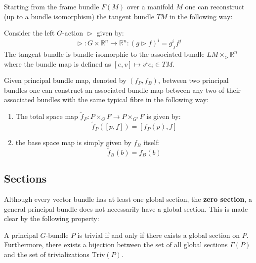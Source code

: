 	\begin{example}
		Starting from the frame bundle $F(M)$ over a manifold $M$ one can reconstruct (up to a bundle isomorphism) the tangent bundle $TM$ in the following way:
		
		Consider the left $G$-action $\vartriangleright$ given by:
		\begin{equation}
			\vartriangleright:G\times\mathbb{R}^n\rightarrow\mathbb{R}^n : (g\vartriangleright f)^i = g^i_{\ j}f^j
		\end{equation}
		The tangent bundle is bundle isomorphic to the associated bundle $LM\times_\vartriangleright \mathbb{R}^n$ where the bundle map is defined as $[e, v]\mapsto v^ie_i \in TM$.
	\end{example}
	
	\begin{construct}
		Given principal bundle map, denoted by $(f_P, f_B)$, between two principal bundles one can construct an associated bundle map between any two of their associated bundles with the same typical fibre in the following way:
		\begin{enumerate}
			\item The total space map $\widetilde{f}_P:P\times_G F\rightarrow P\times_{G'} F$ is given by:
			\begin{equation}
				\widetilde{f}_P([p, f]) = [f_P(p), f]
			\end{equation}
			\item the base space map is simply given by $f_B$ itself:
			\begin{equation}
				\widetilde{f}_B(b) = f_B(b)
			\end{equation}
		\end{enumerate}
	\end{construct}

\subsection{Sections}

	Although every vector bundle has at least one global section, the \textbf{zero section}\footnotemark, a general principal bundle does not necessarily have a global section. This is made clear by the following property:
	\begin{property}
		A principal $G$-bundle $P$ is trivial if and only if there exists a global section on $P$. Furthermore, there exists a bijection between the set of all global sections $\Gamma(P)$ and the set of trivializations $\text{Triv}(P)$.
	\end{property}
	
